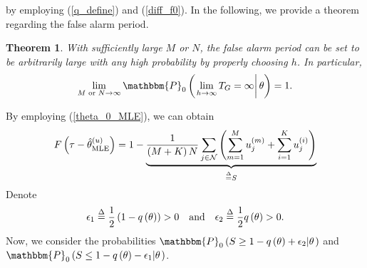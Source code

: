 \documentclass[11pt, draftclsnofoot, onecolumn]{IEEEtran}
\newtheorem{theorem}{Theorem}
\newcommand{\bbP}{\mathbbm{P}}
\begin{document}
by employing (\ref{q_define}) and (\ref{diff_f0}).
In the following, we provide a theorem regarding the false alarm period.
\begin{theorem} \label{Theorem_T_G_Unattack}
	With sufficiently large $M$ or $N$, 
the false alarm period can be set to be arbitrarily large with any high probability by properly choosing $h$. In particular,
	\begin{equation}
	\mathop {\lim }\limits_{M \text{ or } N \to \infty } {\bbP_0}\left( {\left. {\mathop {\lim }\limits_{h \to \infty } {T_G} = \infty } \right|\theta } \right) = 1.
	\end{equation}
\end{theorem}
\begin{IEEEproof}
By employing (\ref{theta_0_MLE}), we can obtain
\begin{equation} \label{S_define}
F\left( {\tau  - \hat \theta _{{\rm{MLE}}}^{(u)}} \right) = 1 - \underbrace {\frac{1}{{\left( {M + K} \right)N}}\sum\limits_{j \in {\cal N}} {\left( {\sum\limits_{m = 1}^M {u_j^{(m)}}  + \sum\limits_{i = 1}^K {u_j^{(i)}} } \right)} }_{\buildrel \Delta \over = S}
\end{equation}
Denote
\begin{equation} \label{epsilon_define}
{\epsilon_1} \buildrel \Delta \over = \frac{1}{2}\left( {1 - q\left( \theta  \right)} \right) >0 \quad \text{and} \quad {\epsilon_2} \buildrel \Delta \over = \frac{1}{2}q\left( \theta  \right) >0.
\end{equation}
Now, we consider the probabilities ${\bbP_0}\left( {S \ge 1 - q\left( \theta  \right) + {\epsilon_2}} {\left| \theta  \right.}  \right)$ and ${\bbP_0}\left( {S \le 1 - q\left( \theta  \right) - {\epsilon_1}} {\left| \theta  \right.} \right)$.


\end{IEEEproof}
\end{document}
